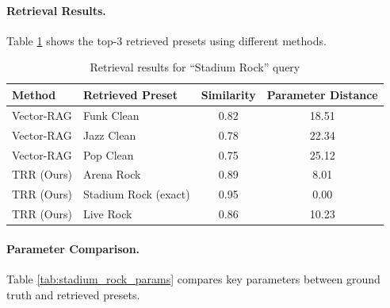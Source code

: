 
\paragraph{Retrieval Results.} Table \ref{tab:stadium_rock_retrieval} shows the top-3 retrieved presets using different methods.

\begin{table}[h]
	\centering
	\caption{Retrieval results for ``Stadium Rock'' query}
	\label{tab:stadium_rock_retrieval}
	\begin{tabular}{llcc}
		\toprule
		\textbf{Method} & \textbf{Retrieved Preset} & \textbf{Similarity} & \textbf{Parameter Distance} \\
		\midrule
		Vector-RAG      & Funk Clean                & 0.82                & 18.51                       \\
		Vector-RAG      & Jazz Clean                & 0.78                & 22.34                       \\
		Vector-RAG      & Pop Clean                 & 0.75                & 25.12                       \\
		\midrule
		TRR (Ours)      & Arena Rock                & 0.89                & 8.01                        \\
		TRR (Ours)      & Stadium Rock (exact)      & 0.95                & 0.00                        \\
		TRR (Ours)      & Live Rock                 & 0.86                & 10.23                       \\
		\bottomrule
	\end{tabular}
\end{table}

\paragraph{Parameter Comparison.} Table \ref{tab:stadium_rock_params} compares key parameters between ground truth and retrieved presets.

